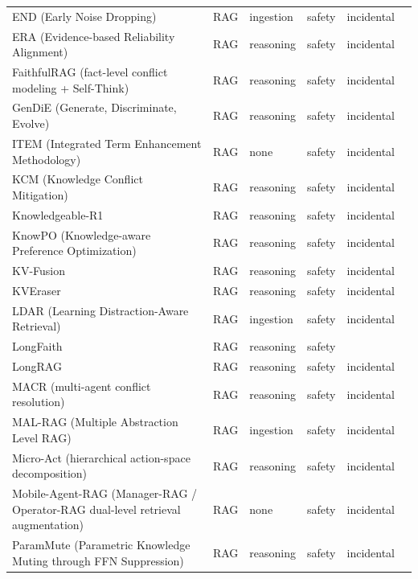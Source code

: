 \begin{longtable}{@{}p{}lllll@{}}
END (Early Noise Dropping) & RAG & ingestion & safety & incidental & \cite{jin-2025-end} \\
ERA (Evidence-based Reliability Alignment) & RAG & reasoning & safety & incidental & \cite{shin-2026-era} \\
FaithfulRAG (fact-level conflict modeling + Self-Think) & RAG & reasoning & safety & incidental & \cite{zhang-2025-faithfulrag} \\
GenDiE (Generate, Discriminate, Evolve) & RAG & reasoning & safety & incidental & \cite{li-2025-generate} \\
ITEM (Integrated Term Enhancement Methodology) & RAG & none & safety & incidental & \cite{bei-2024-manufacturing} \\
KCM (Knowledge Conflict Mitigation) & RAG & reasoning & safety & incidental & \cite{an-2026-enhancing} \\
Knowledgeable-R1 & RAG & reasoning & safety & incidental & \cite{lin-2025-resisting} \\
KnowPO (Knowledge-aware Preference Optimization) & RAG & reasoning & safety & incidental & \cite{zhang-2024-knowpo} \\
KV-Fusion & RAG & reasoning & safety & incidental & \cite{oh-2025-parallel} \\
KVEraser & RAG & reasoning & safety & incidental & \cite{li-2026-kveraser} \\
LDAR (Learning Distraction-Aware Retrieval) & RAG & ingestion & safety & incidental & \cite{shim-2025-rag} \\
LongFaith & RAG & reasoning & safety &  & \cite{yang-2025-longfaith} \\
LongRAG & RAG & reasoning & safety & incidental & \cite{zhao-2024-longrag} \\
MACR (multi-agent conflict resolution) & RAG & reasoning & safety & incidental & \cite{peng-2026-navigating} \\
MAL-RAG (Multiple Abstraction Level RAG) & RAG & ingestion & safety & incidental & \cite{zheng-2025-multiple} \\
Micro-Act (hierarchical action-space decomposition) & RAG & reasoning & safety & incidental & \cite{huo-2025-microact} \\
Mobile-Agent-RAG (Manager-RAG / Operator-RAG dual-level retrieval augmentation) & RAG & none & safety & incidental & \cite{zhou-2025-mobileagentrag} \\
ParamMute (Parametric Knowledge Muting through FFN Suppression) & RAG & reasoning & safety & incidental & \cite{huang-2025-parammute} \\

\end{longtable}
